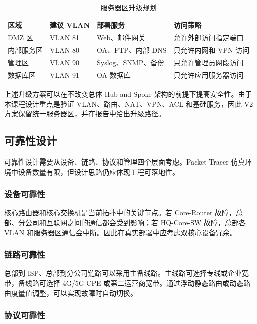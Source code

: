 \documentclass[12pt,a4paper]{ctexart}
\begin{document}
\begin{table}[H]
\centering
\caption{服务器区升级规划}
\label{tab:dmz-upgrade}
\begin{tabular}{|p{3cm}|p{3cm}|p{4cm}|p{4cm}|}
\hline
\textbf{区域} & \textbf{建议 VLAN} & \textbf{部署服务} & \textbf{访问策略} \\ \hline
DMZ 区 & VLAN 81 & Web、邮件网关 & 允许外部访问指定端口 \\ \hline
内部服务区 & VLAN 80 & OA、FTP、内部 DNS & 只允许内网和 VPN 访问 \\ \hline
管理区 & VLAN 90 & Syslog、SNMP、备份 & 只允许管理员网段访问 \\ \hline
数据库区 & VLAN 91 & OA 数据库 & 只允许应用服务器访问 \\ \hline
\end{tabular}
\end{table}

上述升级方案可以在不改变总体 Hub-and-Spoke 架构的前提下提高安全性。由于本课程设计重点是验证 VLAN、路由、NAT、VPN、ACL 和基础服务，因此 V2 方案保留统一服务器区，并在报告中给出升级路径。

\subsection{可靠性设计}

可靠性设计需要从设备、链路、协议和管理四个层面考虑。Packet Tracer 仿真环境中设备数量有限，但设计思路仍应体现工程可落地性。

\subsubsection{设备可靠性}

核心路由器和核心交换机是当前拓扑中的关键节点。若 Core-Router 故障，总部、分公司和互联网之间的通信都会受到影响；若 HQ-Core-SW 故障，总部各 VLAN 和服务器区通信会中断。因此在真实部署中应考虑双核心设备冗余。

\subsubsection{链路可靠性}

总部到 ISP、总部到分公司链路可以采用主备线路。主线路可选择专线或企业宽带，备线路可选择 4G/5G CPE 或第二运营商宽带。通过浮动静态路由或动态路由度量值调整，可以实现故障时自动切换。

\subsubsection{协议可靠性}
\end{document}
